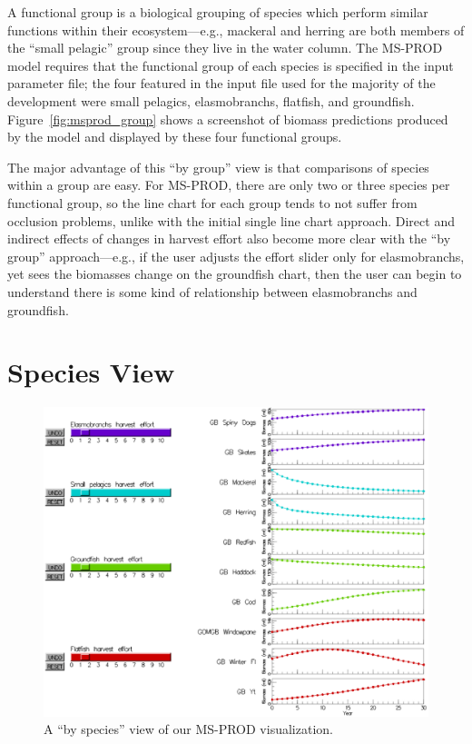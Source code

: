 A functional group is a biological grouping of species which perform similar functions within their ecosystem---e.g., mackeral and herring are both members of the ``small pelagic'' group since they live in the water column.  The MS-PROD model requires that the functional group of each species is specified in the input parameter file; the four featured in the input file used for the majority of the development were small pelagics, elasmobranchs, flatfish, and groundfish.  Figure~\ref{fig:msprod_group} shows a screenshot of biomass predictions produced by the model and displayed by these four functional groups.

The major advantage of this ``by group'' view is that comparisons of species within a group are easy.  For MS-PROD, there are only two or three species per functional group, so the line chart for each group tends to not suffer from occlusion problems, unlike with the initial single line chart approach.  Direct and indirect effects of changes in harvest effort also become more clear with the ``by group'' approach---e.g., if the user adjusts the effort slider only for elasmobranchs, yet sees the biomasses change on the groundfish chart, then the user can begin to understand there is some kind of relationship between elasmobranchs and groundfish.

\section{Species View}

\begin{figure}[h]
	\centering
	\includegraphics[width=13cm]{figures/eps/msprod_species.eps}
	\caption{A ``by species'' view of our MS-PROD visualization.}
	\label{fig:msprod_species}
\end{figure}

